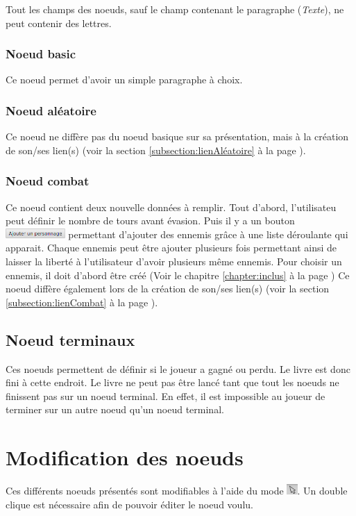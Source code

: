			Tout les champs des noeuds, sauf le champ contenant le paragraphe (\textit{Texte}), ne peut contenir des lettres.

			\subsubsection{Noeud basic}
				Ce noeud permet d'avoir un simple paragraphe à choix.

			\subsubsection{Noeud aléatoire}
				Ce noeud ne diffère pas du noeud basique sur sa présentation, mais à la création de son/ses lien(s) (voir la section \ref{subsection:lienAléatoire} à la page \pageref{subsection:lienAléatoire}).

			\subsubsection{Noeud combat}\label{subsubsection:combat}
				Ce noeud contient deux nouvelle données à remplir. Tout d'abord, l'utilisateu peut définir le nombre de tours avant évasion. Puis il y a un bouton \includegraphics[height=10pt]{img/noeudAddPersonnage} permettant d'ajouter des ennemis grâce à une liste déroulante qui apparait. Chaque ennemis peut être ajouter plusieurs fois permettant ainsi de laisser la liberté à l'utilisateur d'avoir plusieurs même ennemis. Pour choisir un ennemis, il doit d'abord être créé (Voir le chapitre \ref{chapter:inclus} à la page \pageref{chapter:inclus})
				Ce noeud diffère également lors de la création de son/ses lien(s) (voir la section \ref{subsection:lienCombat} à la page \pageref{subsection:lienCombat}).

		\subsection{Noeud terminaux}
			Ces noeuds permettent de définir si le joueur a gagné ou perdu. Le livre est donc fini à cette endroit. Le livre ne peut pas être lancé tant que tout les noeuds ne finissent pas sur un noeud terminal. En effet, il est impossible au joueur de terminer sur un autre noeud qu'un noeud terminal.

	\section{Modification des noeuds}
		Ces différents noeuds présentés sont modifiables à l'aide du mode \includegraphics[height=0.4cm]{img/modeSelected.png}. Un double clique est nécessaire afin de pouvoir éditer le noeud voulu.

